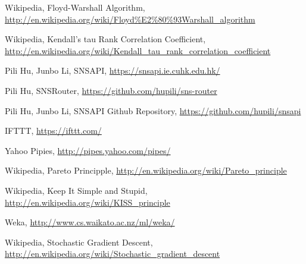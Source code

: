 	Wikipedia, Floyd-Warshall Algorithm, 
	\url{http://en.wikipedia.org/wiki/Floyd%E2%80%93Warshall_algorithm}

	Wikipedia, Kendall's tau Rank Correlation Coefficient,
	\url{http://en.wikipedia.org/wiki/Kendall_tau_rank_correlation_coefficient}

	Pili Hu, Junbo Li, SNSAPI, \url{https://snsapi.ie.cuhk.edu.hk/}

	Pili Hu, SNSRouter, \url{https://github.com/hupili/sns-router}

	Pili Hu, Junbo Li, SNSAPI Github Repository, \url{https://github.com/hupili/snsapi}

	IFTTT, \url{https://ifttt.com/}

	Yahoo Pipies, \url{http://pipes.yahoo.com/pipes/}

	Wikipedia, Pareto Principple, \url{http://en.wikipedia.org/wiki/Pareto_principle}

	Wikipedia, Keep It Simple and Stupid, \url{http://en.wikipedia.org/wiki/KISS_principle}

	Weka, \url{http://www.cs.waikato.ac.nz/ml/weka/}

	Wikipedia, Stochastic Gradient Descent, 
	\url{http://en.wikipedia.org/wiki/Stochastic_gradient_descent}
